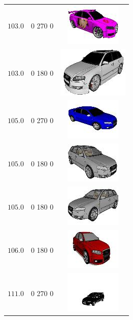 \begin{longtable}{ccc}
	$103.0$ & 0 270 0 & \includegraphics{models/20686840ff4261097d59111fc550b15d.jpg}\\
	$103.0$ & 0 180 0 & \includegraphics{models/48ba3d4afcce62b570a637753420b32.jpg}\\
	$105.0$ & 0 270 0 & \includegraphics{models/2521a90182ccc29c253c03b7df20edd5.jpg}\\
	$105.0$ & 0 180 0 & \includegraphics{models/a505d6f89d2f65dd979ef391885ee5d2.jpg}\\
	$105.0$ & 0 180 0 & \includegraphics{models/c9846f42e388448371dc7d15fb4931c.jpg}\\
	$106.0$ & 0 180 0 & \includegraphics{models/46a506baacdf7058fcba8d114844bdf.jpg}\\
		$111.0$ & 0 270 0 & \includegraphics{models/c72726c99ca0206260518ccdcef8f619.jpg}\\

\end{longtable}
